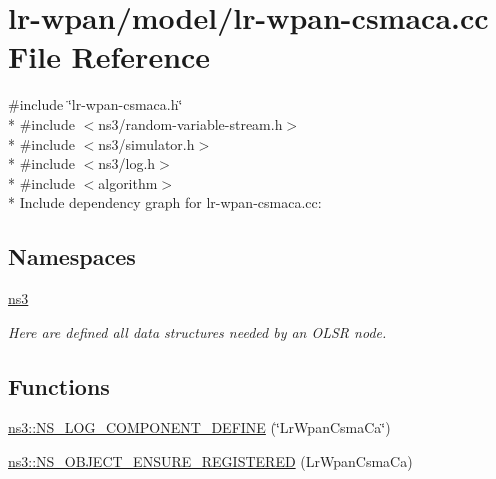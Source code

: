 \hypertarget{lr-wpan-csmaca_8cc}{}\section{lr-\/wpan/model/lr-\/wpan-\/csmaca.cc File Reference}
\label{lr-wpan-csmaca_8cc}
{\ttfamily \#include \char`\"{}lr-\/wpan-\/csmaca.\+h\char`\"{}}\\*
{\ttfamily \#include $<$ns3/random-\/variable-\/stream.\+h$>$}\\*
{\ttfamily \#include $<$ns3/simulator.\+h$>$}\\*
{\ttfamily \#include $<$ns3/log.\+h$>$}\\*
{\ttfamily \#include $<$algorithm$>$}\\*
Include dependency graph for lr-\/wpan-\/csmaca.cc\+:
\subsection*{Namespaces}
\begin{DoxyCompactItemize}
\item 
 \hyperlink{namespacens3}{ns3}
\begin{DoxyCompactList}\small\item\em Here are defined all data structures needed by an O\+L\+SR node. \end{DoxyCompactList}\end{DoxyCompactItemize}
\subsection*{Functions}
\begin{DoxyCompactItemize}
\item 
\hyperlink{namespacens3_a03436ada082dc4c4d7a23d7b90494096}{ns3\+::\+N\+S\+\_\+\+L\+O\+G\+\_\+\+C\+O\+M\+P\+O\+N\+E\+N\+T\+\_\+\+D\+E\+F\+I\+NE} (\char`\"{}Lr\+Wpan\+Csma\+Ca\char`\"{})
\item 
\hyperlink{namespacens3_acb4c774e124482f3513ef86346b35458}{ns3\+::\+N\+S\+\_\+\+O\+B\+J\+E\+C\+T\+\_\+\+E\+N\+S\+U\+R\+E\+\_\+\+R\+E\+G\+I\+S\+T\+E\+R\+ED} (Lr\+Wpan\+Csma\+Ca)
\end{DoxyCompactItemize}
